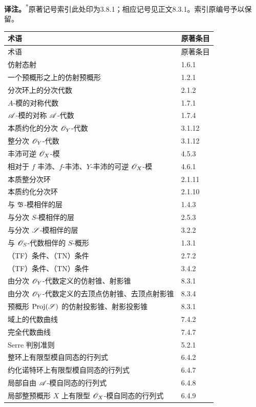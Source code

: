 \noindent\textbf{译注。}\textsuperscript{*}原著记号索引此处印为3.8.1；相应记号见正文8.3.1。索引原编号予以保留。

\begingroup\small
\begin{longtable}{@{}p{}@{\hspace{1em}}p{}@{}}
\toprule 术语 & 原著条目\\\midrule\endfirsthead
\toprule 术语 & 原著条目\\\midrule\endhead\bottomrule\endfoot
仿射态射 &1.6.1\\
一个预概形之上的仿射预概形 &1.2.1\\
分次环上的分次代数 &2.1.2\\
$A$-模的对称代数 &1.7.1\\
$\mathscr A$-模的对称 $\mathscr A$-代数 &1.7.4\\
本质约化的分次 $\mathscr O_Y$-代数 &3.1.12\\
整分次 $\mathscr O_Y$-代数 &3.1.12\\
丰沛可逆 $\mathscr O_X$-模 &4.5.3\\
相对于 $f$ 丰沛、$f$-丰沛、$Y$-丰沛的可逆 $\mathscr O_X$-模 &4.6.1\\
本质整分次环 &2.1.11\\
本质约化分次环 &2.1.10\\
与 $\mathfrak B$-模相伴的层 &1.4.3\\
与分次 $S$-模相伴的层 &2.5.3\\
与分次 $\mathscr S$-模相伴的层 &3.2.2\\
与 $\mathscr O_S$-代数相伴的 $S$-概形 &1.3.1\\
（TF）条件、（TN）条件 &2.7.2\\
（TF）条件、（TN）条件 &3.4.2\\
由分次 $\mathscr O_Y$-代数定义的仿射锥、射影锥 &8.3.1\\
由分次 $\mathscr O_Y$-代数定义的去顶点仿射锥、去顶点射影锥 &8.3.4\\
预概形 $\operatorname{Proj}(\mathscr S)$ 的仿射投影锥、射影投影锥 &8.3.1\\
域上的代数曲线 &7.4.2\\
完全代数曲线 &7.4.7\\
Serre 判别准则 &5.2.1\\
整环上有限型模自同态的行列式 &6.4.2\\
约化诺特环上有限型模自同态的行列式 &6.4.7\\
局部自由 $\mathscr A$-模自同态的行列式 &6.4.8\\
局部整预概形 $X$ 上有限型 $\mathscr O_X$-模自同态的行列式 &6.4.9\\

\end{longtable}
